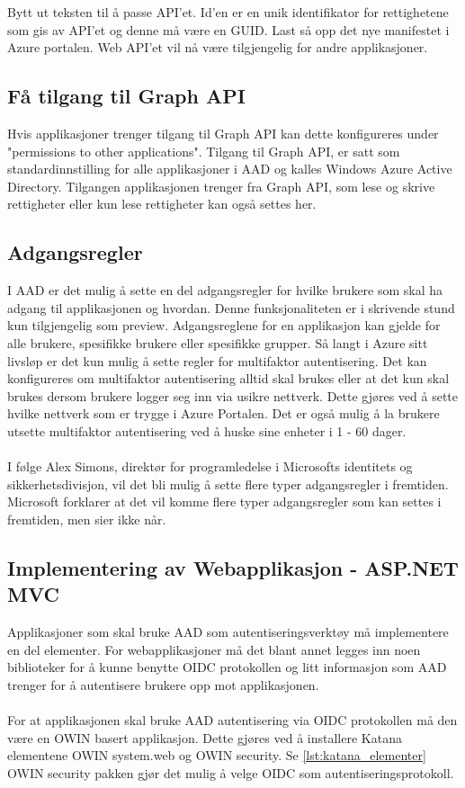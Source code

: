 Bytt ut teksten til å passe API'et. Id'en er en unik identifikator for rettighetene som gis av API'et og denne må være en GUID. Last så opp det nye manifestet i Azure portalen. Web API'et vil nå være tilgjengelig for andre applikasjoner.

\subsection*{Få tilgang til Graph API}
Hvis applikasjoner trenger tilgang til Graph API kan dette konfigureres under "permissions to other applications". Tilgang til Graph API, er satt som standardinnstilling for alle applikasjoner i AAD og kalles Windows Azure Active Directory. Tilgangen applikasjonen trenger fra Graph API, som lese og skrive rettigheter eller kun lese rettigheter kan også settes her. 

\subsection*{Adgangsregler}
I AAD er det mulig å sette en del adgangsregler for hvilke brukere som skal ha adgang til applikasjonen og hvordan. Denne funksjonaliteten er i skrivende stund kun tilgjengelig som preview. Adgangsreglene for en applikasjon kan gjelde for alle brukere, spesifikke brukere eller spesifikke grupper. Så langt i Azure sitt livsløp er det kun mulig å sette regler for multifaktor autentisering. Det kan konfigureres om multifaktor autentisering alltid skal brukes eller at det kun skal brukes dersom brukere logger seg inn via usikre nettverk. Dette gjøres ved å sette hvilke nettverk som er trygge i Azure Portalen. Det er også mulig å la brukere utsette multifaktor autentisering ved å huske sine enheter i 1 - 60 dager. \\
\\
I følge Alex Simons, direktør for programledelse i Microsofts identitets og sikkerhetsdivisjon, vil det bli mulig å sette flere typer adgangsregler i fremtiden\cite{AccessRules}. Microsoft forklarer at det vil komme flere typer adgangsregler som kan settes i fremtiden, men sier ikke når.

\subsection{Implementering av Webapplikasjon - ASP.NET MVC}
\label{subsec:konfigurasjon_handteringAvApplikasjoner_Webapplikasjon}
Applikasjoner som skal bruke AAD som autentiseringsverktøy må implementere en del elementer. For webapplikasjoner må det blant annet legges inn noen biblioteker for å kunne benytte OIDC protokollen og litt informasjon som AAD trenger for å autentisere brukere opp mot applikasjonen. \\
\\
For at applikasjonen skal bruke AAD autentisering via OIDC protokollen må den være en OWIN basert applikasjon. Dette gjøres ved å installere Katana elementene OWIN system.web og OWIN security. Se \ref{lst:katana_elementer} OWIN security pakken gjør det mulig å velge OIDC som autentiseringsprotokoll. \cite{WebappTutorialCloudIdentity}

